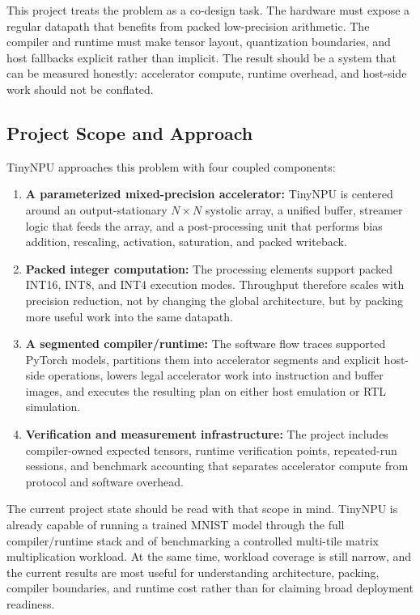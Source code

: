 \documentclass[a4paper, 12pt, titlepage]{article}
\begin{document}
This project treats the problem as a co-design task. The hardware must expose a regular datapath that benefits from packed low-precision arithmetic. The compiler and runtime must make tensor layout, quantization boundaries, and host fallbacks explicit rather than implicit. The result should be a system that can be measured honestly: accelerator compute, runtime overhead, and host-side work should not be conflated.

\subsection{Project Scope and Approach}
TinyNPU approaches this problem with four coupled components:
\begin{enumerate}
    \item \textbf{A parameterized mixed-precision accelerator:} TinyNPU is centered around an output-stationary $N \times N$ systolic array, a unified buffer, streamer logic that feeds the array, and a post-processing unit that performs bias addition, rescaling, activation, saturation, and packed writeback.
    \item \textbf{Packed integer computation:} The processing elements support packed INT16, INT8, and INT4 execution modes. Throughput therefore scales with precision reduction, not by changing the global architecture, but by packing more useful work into the same datapath.
    \item \textbf{A segmented compiler/runtime:} The software flow traces supported PyTorch models, partitions them into accelerator segments and explicit host-side operations, lowers legal accelerator work into instruction and buffer images, and executes the resulting plan on either host emulation or RTL simulation.
    \item \textbf{Verification and measurement infrastructure:} The project includes compiler-owned expected tensors, runtime verification points, repeated-run sessions, and benchmark accounting that separates accelerator compute from protocol and software overhead.
\end{enumerate}

The current project state should be read with that scope in mind. TinyNPU is already capable of running a trained MNIST model through the full compiler/runtime stack and of benchmarking a controlled multi-tile matrix multiplication workload. At the same time, workload coverage is still narrow, and the current results are most useful for understanding architecture, packing, compiler boundaries, and runtime cost rather than for claiming broad deployment readiness.
\end{document}
